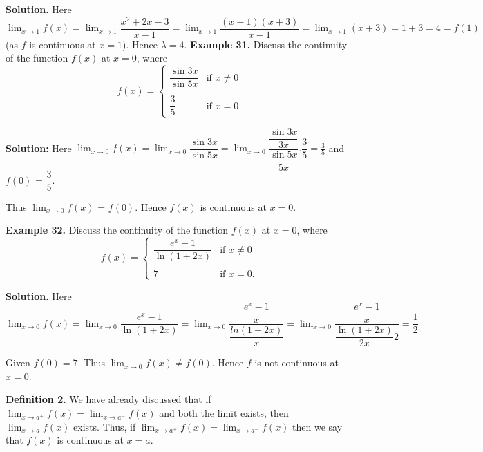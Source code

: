 \documentclass[../../main.tex]{subfiles}
\begin{document}
\textbf{Solution.} Here $\lim_{x\rightarrow 1}f(x) = \lim_{x\rightarrow 1}\dfrac{x^2+2x-3}{x-1}
 = \lim_{x\rightarrow 1}\dfrac{(x-1)(x+3)}{x-1} = \lim_{x\rightarrow 1} {(x+3)} = 1+3 = 4 = f(1)$ (as $f$ is continuous at $x=1$). Hence  $\lambda =4$.
\newpage
\vspace{0.2cm}
\textbf{Example 31.}
\vspace{0.2cm}
Discuss the continuity of the function $f(x)$ at $x=0$, where 
\begin{equation*}
    f(x) = 
 \begin{cases}
     \dfrac{\sin 3x}{\sin 5x}   & \text{if   }  x \neq 0 \\\\
      \dfrac{3}{5}                      & \text{if  }   x=0
 \end{cases}
\end{equation*}

\textbf{Solution:} Here $\lim_{x\rightarrow 0}f(x) = \lim_{x\rightarrow 0}\dfrac{\sin 3x}{\sin 5x}  = \lim_{x\rightarrow 0}\dfrac{\dfrac{\sin 3x}{3x}}{\dfrac{\sin 5x}{5x}}.\dfrac{3}{5} = \frac{3}{5}$ and $f(0)$ = $\dfrac{3}{5}$. 

Thus $\lim_{x\rightarrow 0}{f(x)}$ = $f(0).$ Hence $f(x)$ is continuous at $x=0.$

\vspace{0.2cm}
\textbf{Example 32.}
\vspace{0.2cm}
Discuss the continuity of the function $f(x)$ at $x=0$, where 
\begin{equation*}
     f(x) = 
 \begin{cases}
     \dfrac{e^{x}-1} {\ln(1+2x)}   & \text{if   }  x \neq 0 \\\\
      7                      & \text{if  }   x=0.
 \end{cases}
\end{equation*}

\textbf{Solution.} Here $\lim_{x\rightarrow 0}f(x) = \lim_{x\rightarrow 0}\dfrac{e^{x}-1}{\ln(1+2x)} = \lim_{x\rightarrow 0}\dfrac{\dfrac{e^{x}-1}{x}}{\dfrac{ln(1+2x)}{x}} = \lim_{x\rightarrow 0}\dfrac{\dfrac{e^{x}-1}{x}}{\dfrac{\ln(1+2x)}{2x}2} = \dfrac{1}{2}$

Given $f(0)=7$. Thus $\lim_{x\rightarrow 0}{f(x)} \neq f(0)$. Hence $f$ is not continuous at $x=0$.

\vspace{0.3cm}
\textbf{Definition 2.} We have already discussed that if $\lim_{x\rightarrow a^+}{f(x)} = \lim_{x\rightarrow a^-}{f(x)}$ and both the limit exists, then $\lim_{x\rightarrow a}f(x)$ exists.
Thus, if $\lim_{x\rightarrow a^+}f(x) = \lim_{x\rightarrow a^-}f(x)$ then we say that $f(x)$ is continuous at $x=a$.
\end{document}
